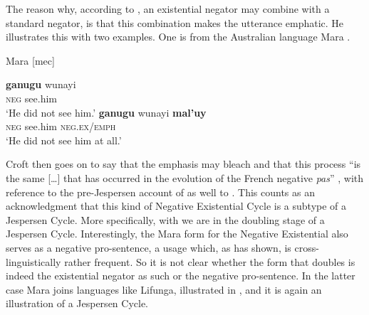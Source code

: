 ﻿\documentclass[output=paper]{langsci/langscibook}
\begin{document}
The reason why, according to \textcite[13--14]{Croft1991}, an existential
negator may combine with a standard negator, is that this combination makes
the utterance emphatic. He illustrates this with two examples. One is from
the Australian language Mara \parencite[289]{Heath1981}.
%
\begin{exe}\ex\label{ex:int-mara-see}
          Mara [mec]
          \begin{xlist}
    \ex \gll \textbf{ganugu}  wunayi \\
\textsc{neg}    see.him \\
    \glt `He did not see him.'
    \ex\label{ex:int-mara-see-at-all}
    \gll \textbf{ganugu}  wunayi  \textbf{mal'uy}\\
\textsc{neg}    see.him  \textsc{neg.ex/emph}\\
    \glt `He did not see him at all.'
    \end{xlist}\end{exe}
%
Croft then goes on to say that the emphasis may bleach and that this
process ``is the same [\ldots] that has occurred in the evolution of the French
negative \textit{pas}'' \parencite[14]{Croft1991}, with reference to the
pre-Jespersen account of \citet{Meillet1912} as well to
\textcites{Schwegler1983}{Schwegler1988}. This counts as an acknowledgment
that this kind of Negative
Existential Cycle is a subtype of a Jespersen Cycle. More specifically,
with  we are in the doubling stage of a Jespersen Cycle.
Interestingly, the Mara form for the Negative Existential also serves as a
negative pro-sentence, a usage which, as \textcite[127]{Veselinova2013}
has shown, is cross-linguistically rather frequent. So it is not clear
whether the form that doubles is indeed the existential negator as such or
the negative pro-sentence. In the latter case Mara joins languages like
Lifunga, illustrated in , and it is again an
illustration of a Jespersen Cycle. 
\end{document}
